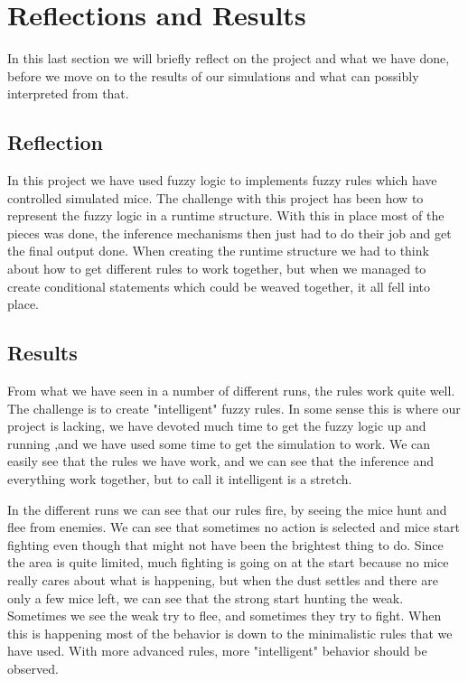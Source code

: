 \section{Reflections and Results}\label{reflections and results}
In this last section we will briefly reflect on the project and what we have
done, before we move on to the results of our simulations and what can
possibly interpreted from that.

\subsection{Reflection}\label{reflection}
In this project we have used fuzzy logic to implements fuzzy rules which have
controlled simulated mice. The challenge with this project has been how to
represent the fuzzy logic in a runtime structure. With this in place most of
the pieces was done, the inference mechanisms then just had to do their job
and get the final output done. When creating the runtime structure we had to
think about how to get different rules to work together, but when we managed
to create conditional statements which could be weaved together, it all fell into
place.

\subsection{Results}\label{results}
From what we have seen in a number of different runs, the rules work
quite well. The challenge is to create "intelligent" fuzzy rules. In some
sense this is where our project is lacking, we have devoted much time to
get the fuzzy logic up and running ,and we have used some time to get the
simulation to work. We can easily see that the rules we have work, and we
can see that the inference and everything work together, but to call
it intelligent is a stretch.

In the different runs we can see that our rules fire, by seeing the mice
hunt and flee from enemies. We can see that sometimes no action is selected
and mice start fighting even though that might not have been the brightest thing
to do. Since the area is quite limited, much fighting is going on at the start
because no mice really cares about what is happening, but when the dust settles
and there are only a few mice left, we can see that the strong start hunting
the weak. Sometimes we see the weak try to flee, and sometimes they try to
fight. When this is happening most of the behavior is down to the minimalistic
rules that we have used. With more advanced rules, more "intelligent" behavior
should be observed.

